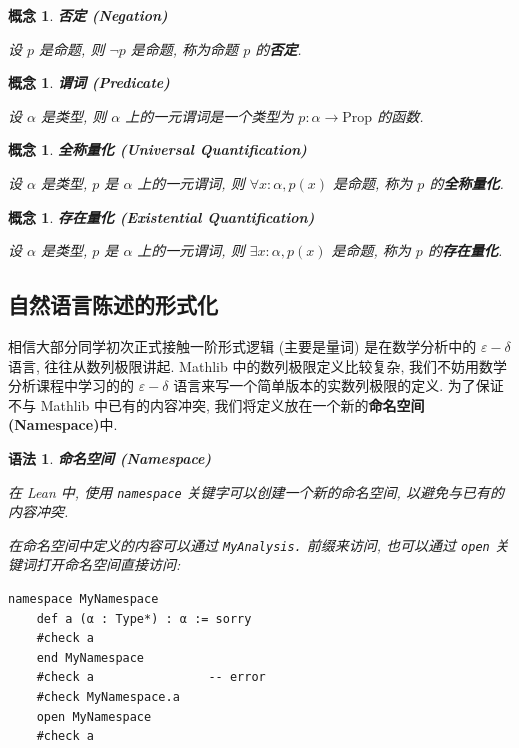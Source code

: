 \documentclass[UTF8]{ctexart}
\DeclareMathOperator{\0}{\mathbf{0}}                    %
\newcommand{\<}{\langle}
\renewcommand{\>}{\rangle}                              %
\newenvironment{dfn_box}{
    \begin{tcolorbox}[enhanced, colback=dfn_green2, boxrule=0pt, frame hidden,
        borderline west={0.7mm}{0.1mm}{dfn_green1},breakable]
    }
    {\end{tcolorbox}}
\newenvironment{thm_box}{
    \begin{tcolorbox}[enhanced, colback=thm_blue2, boxrule=0pt, frame hidden,
        borderline west={0.7mm}{0.1mm}{thm_blue1},breakable]
    }
    {\end{tcolorbox}}
\theoremstyle{MyStyle} %
\newtheorem{concept}[definition]{概念}
\newenvironment{cpt}[1]
{
    \begin{dfn_box}
        \begin{concept}
            \textbf{#1}
            \newline
}
{
        \end{concept}
    \end{dfn_box}
}
\newtheorem{syntax}[definition]{语法}
\newenvironment{syn}[1]
{
    \begin{thm_box}
        \begin{syntax}
            \textbf{#1}
            \newline
}
{
        \end{syntax}
    \end{thm_box}
}
\newcommand*{\lean}[1]{\texttt{\color{blue}#1}}
\begin{document}
        \begin{cpt}
            {否定 (Negation)}
            设 \(p\) 是命题, 则 \(\neg p\) 是命题, 称为命题 \(p\) 的\textbf{否定}. 
        \end{cpt}

        \begin{cpt}
            {谓词 (Predicate)}
            设 \(\alpha\) 是类型, 则 \(\alpha\) 上的一元谓词是一个类型为 \(p : \alpha \to \text{Prop}\) 的函数. 
        \end{cpt}

        \begin{cpt}
            {全称量化 (Universal Quantification)}
            设 \(\alpha\) 是类型, \(p\) 是 \(\alpha\) 上的一元谓词, 则 \(\forall x : \alpha, p(x)\) 是命题, 称为 \(p\) 的\textbf{全称量化}. 
        \end{cpt}

        \begin{cpt}
            {存在量化 (Existential Quantification)}
            设 \(\alpha\) 是类型, \(p\) 是 \(\alpha\) 上的一元谓词, 则 \(\exists x : \alpha, p(x)\) 是命题, 称为 \(p\) 的\textbf{存在量化}. 
        \end{cpt}

    \subsection{自然语言陈述的形式化}

        相信大部分同学初次正式接触一阶形式逻辑 (主要是量词) 是在数学分析中的 $\varepsilon-\delta$ 语言, 往往从数列极限讲起. Mathlib 中的数列极限定义比较复杂, 我们不妨用数学分析课程中学习的的 $\varepsilon-\delta$ 语言来写一个简单版本的实数列极限的定义. 为了保证不与 Mathlib 中已有的内容冲突, 我们将定义放在一个新的\textbf{命名空间 (Namespace)}中. 

        \begin{syn}
            {命名空间 (Namespace)}
            在 Lean 中, 使用 \lean{namespace} 关键字可以创建一个新的命名空间, 以避免与已有的内容冲突. 

            在命名空间中定义的内容可以通过 \lean{MyAnalysis.} 前缀来访问, 也可以通过 \lean{open} 关键词打开命名空间直接访问: 
            \begin{lstlisting}[style=lean]
    namespace MyNamespace
    def a (α : Type*) : α := sorry
    #check a
    end MyNamespace
    #check a                -- error
    #check MyNamespace.a
    open MyNamespace
    #check a
            \end{lstlisting}
        \end{syn}
\end{document}
